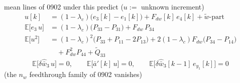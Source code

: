 \documentclass[11pt,a4paper,fontset=none]{ctexart}
\newcommand{\ba}{\bar{a}}
\newcommand{\bw}{\bar{w}}
\newcommand{\E}{\mathbb{E}}
\begin{document}
mean lines of 0902 under this predict ($u := $ unknown increment)
\begin{align*}
u[k] &= (1-\lambda_c)\bigl(e_3[k] - e_1[k]\bigr) + F_{dw}[k]\,e_4[k] + \tilde{w}\text{-part} \\
\E\bigl[e_3\,u\bigr] &= (1-\lambda_c)\bigl(P_{33} - P_{31}\bigr) + F_{dw}\,P_{34} \\
\E\bigl[u^{2}\bigr] &= (1-\lambda_c)^{2}\bigl(P_{33} + P_{11} - 2P_{13}\bigr)
   + 2(1-\lambda_c)F_{dw}\bigl(P_{34} - P_{14}\bigr) \\
   &\quad + F_{dw}^{2}P_{44} + \tilde{Q}_{33}
\end{align*}
\begin{equation*}
\E\bigl[\delta\hat{\bw}_3\,u\bigr] = 0 , \qquad \E\bigl[\ba'[k]\,u\bigr] = 0 , \qquad
\E\bigl[\delta\hat{\bw}_3[k-1]\,e_{y_1}[k]\bigr] = 0
\end{equation*}
(the $n_w$ feedthrough family of 0902 vanishes)
\end{document}
